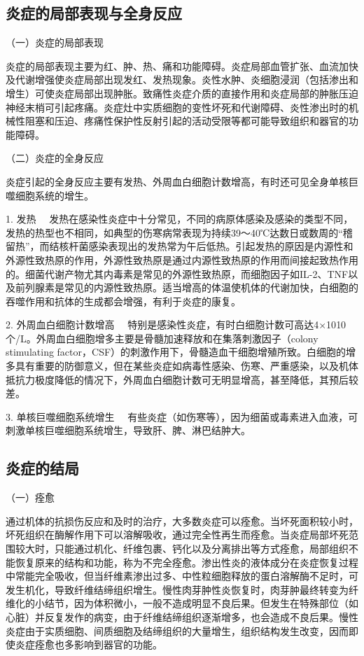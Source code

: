 \subsection{炎症的局部表现与全身反应}

{（一）炎症的局部表现}

炎症的局部表现主要为红、肿、热、痛和功能障碍。炎症局部血管扩张、血流加快及代谢增强使炎症局部出现发红、发热现象。炎性水肿、炎细胞浸润（包括渗出和增生）可使炎症局部出现肿胀。致痛性炎症介质的直接作用和炎症局部的肿胀压迫神经末梢可引起疼痛。炎症灶中实质细胞的变性坏死和代谢障碍、炎性渗出时的机械性阻塞和压迫、疼痛性保护性反射引起的活动受限等都可能导致组织和器官的功能障碍。

{（二）炎症的全身反应}

炎症引起的全身反应主要有发热、外周血白细胞计数增高，有时还可见全身单核巨噬细胞系统的增生。

{1. 发热}
　发热在感染性炎症中十分常见，不同的病原体感染及感染的类型不同，发热的热型也不相同，如典型的伤寒病常表现为持续39～40℃达数日或数周的``稽留热''，而结核杆菌感染表现出的发热常为午后低热。引起发热的原因是内源性和外源性致热原的作用，外源性致热原是通过内源性致热原的作用而间接起致热作用的。细菌代谢产物尤其内毒素是常见的外源性致热原，而细胞因子如IL-2、TNF以及前列腺素是常见的内源性致热原。适当增高的体温使机体的代谢加快，白细胞的吞噬作用和抗体的生成都会增强，有利于炎症的康复。

{2. 外周血白细胞计数增高}
　特别是感染性炎症，有时白细胞计数可高达4×10{10}
个/L。外周血白细胞增多主要是骨髓加速释放和在集落刺激因子（colony
stimulating
factor，CSF）的刺激作用下，骨髓造血干细胞增殖所致。白细胞的增多具有重要的防御意义，但在某些炎症如病毒性感染、伤寒、严重感染，以及机体抵抗力极度降低的情况下，外周血白细胞计数可无明显增高，甚至降低，其预后较差。

{3. 单核巨噬细胞系统增生}
　有些炎症（如伤寒等），因为细菌或毒素进入血液，可刺激单核巨噬细胞系统增生，导致肝、脾、淋巴结肿大。

\subsection{炎症的结局}

{（一）痊愈}

通过机体的抗损伤反应和及时的治疗，大多数炎症可以痊愈。当坏死面积较小时，坏死组织在酶解作用下可以溶解吸收，通过完全性再生而痊愈。当炎症局部坏死范围较大时，只能通过机化、纤维包裹、钙化以及分离排出等方式痊愈，局部组织不能恢复原来的结构和功能，称为不完全痊愈。渗出性炎的液体成分在炎症恢复过程中常能完全吸收，但当纤维素渗出过多、中性粒细胞释放的蛋白溶解酶不足时，可发生机化，导致纤维结缔组织增生。慢性肉芽肿性炎恢复时，肉芽肿最终转变为纤维化的小结节，因为体积微小，一般不造成明显不良后果。但发生在特殊部位（如心脏）并反复发作的病变，由于纤维结缔组织逐渐增多，也会造成不良后果。慢性炎症由于实质细胞、间质细胞及结缔组织的大量增生，组织结构发生改变，因而即使炎症痊愈也多影响到器官的功能。

